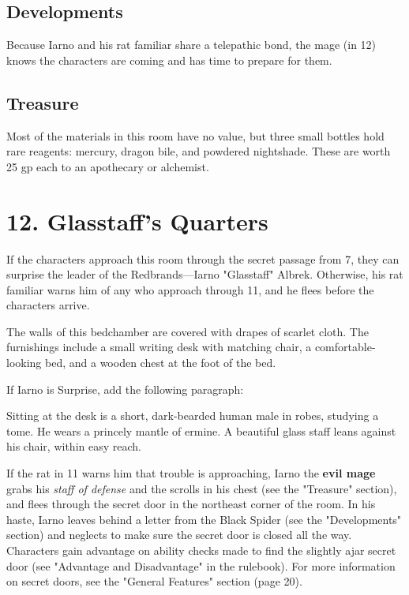 \documentclass[10pt,a4paper,twoside,bg=print,twocolumn,openany,nodeprecatedcode]{dndbook}
\begin{document}
\subsection{Developments}
Because Iarno and his rat familiar share a telepathic bond, the mage (in 12) knows the characters are coming and has time to prepare for them.

\subsection{Treasure}
Most of the materials in this room have no value, but three small bottles hold rare reagents: mercury, dragon bile, and powdered nightshade. These are worth 25 gp each to an apothecary or alchemist.

\section{12. Glasstaff's Quarters}
If the characters approach this room through the secret passage from 7, they can surprise the leader of the Redbrands—Iarno "Glasstaff" Albrek. Otherwise, his rat familiar warns him of any who approach through 11, and he flees before the characters arrive.

\begin{DndReadAloud}{}
The walls of this bedchamber are covered with drapes of scarlet cloth. The furnishings include a small writing desk with matching chair, a comfortable-looking bed, and a wooden chest at the foot of the bed.

\end{DndReadAloud}

If Iarno is Surprise, add the following paragraph:

\begin{DndReadAloud}{}
Sitting at the desk is a short, dark-bearded human male in robes, studying a tome. He wears a princely mantle of ermine. A beautiful glass staff leans against his chair, within easy reach.

\end{DndReadAloud}

If the rat in 11 warns him that trouble is approaching, Iarno the \textbf{evil mage} grabs his \textit{staff of defense} and the scrolls in his chest (see the "Treasure" section), and flees through the secret door in the northeast corner of the room. In his haste, Iarno leaves behind a letter from the Black Spider (see the "Developments" section) and neglects to make sure the secret door is closed all the way. Characters gain advantage on ability checks made to find the slightly ajar secret door (see "Advantage and Disadvantage" in the rulebook). For more information on secret doors, see the "General Features" section (page 20).
\end{document}
